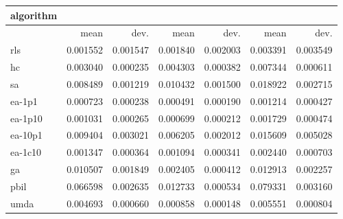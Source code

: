 \begin{tabular}{@{}l*{6}{>{{}}N{1}{2}}@{}}
\toprule
{algorithm} &  &  &  \\
\midrule
& {mean} & {dev.} & {mean} & {dev.} & {mean} & {dev.} \\
\midrule
rls & 0.001552 & 0.001547 & 0.001840 & 0.002003 & 0.003391 & 0.003549 \\
 hc & 0.003040 & 0.000235 & 0.004303 & 0.000382 & 0.007344 & 0.000611 \\
 sa & 0.008489 & 0.001219 & 0.010432 & 0.001500 & 0.018922 & 0.002715 \\
 ea-1p1 & 0.000723 & 0.000238 & 0.000491 & 0.000190 & 0.001214 & 0.000427 \\
 ea-1p10 & 0.001031 & 0.000265 & 0.000699 & 0.000212 & 0.001729 & 0.000474 \\
 ea-10p1 & 0.009404 & 0.003021 & 0.006205 & 0.002012 & 0.015609 & 0.005028 \\
 ea-1c10 & 0.001347 & 0.000364 & 0.001094 & 0.000341 & 0.002440 & 0.000703 \\
 ga & 0.010507 & 0.001849 & 0.002405 & 0.000412 & 0.012913 & 0.002257 \\
 pbil & 0.066598 & 0.002635 & 0.012733 & 0.000534 & 0.079331 & 0.003160 \\
 umda & 0.004693 & 0.000660 & 0.000858 & 0.000148 & 0.005551 & 0.000804 \\
 \bottomrule
\end{tabular}
